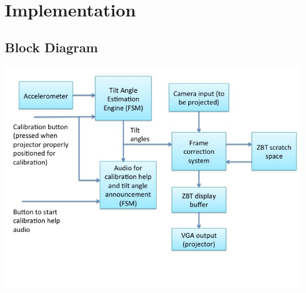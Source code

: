 \documentclass{article}
\begin{document}
\section{Implementation}

\subsection{Block Diagram}
\includegraphics[width=\textwidth]{img/block_diag}
\end{document}
